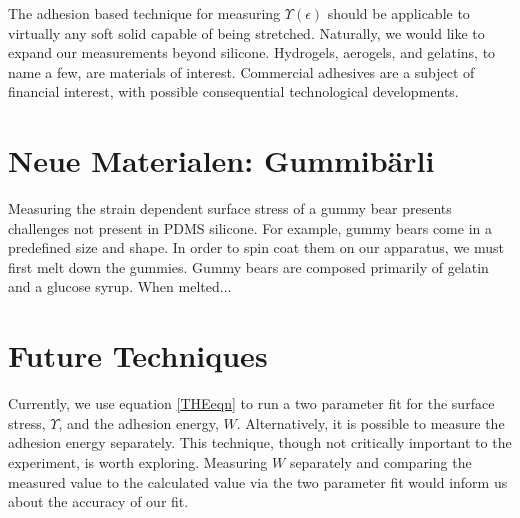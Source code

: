 The adhesion based technique for measuring $\Upsilon(\epsilon)$ should be applicable to virtually any soft solid capable of being stretched. Naturally, we would like to expand our measurements beyond silicone. Hydrogels, aerogels, and gelatins, to name a few, are materials of interest. Commercial adhesives are a subject of financial interest, with possible consequential technological developments.

\section{Neue Materialen: Gummibärli}
Measuring the strain dependent surface stress of a gummy bear presents challenges not present in PDMS silicone. For example, gummy bears come in a predefined size and shape. In order to spin coat them on our apparatus, we must first melt down the gummies. Gummy bears are composed primarily of gelatin and a glucose syrup. When melted...

\section{Future Techniques}
Currently, we use equation \ref{THEeqn} to run a two parameter fit for the surface stress, $ \Upsilon $, and the adhesion energy, $ W $. Alternatively, it is possible to measure the adhesion energy separately. This technique, though not critically important to the experiment, is worth exploring. Measuring $ W $ separately and comparing the measured value to the calculated value via the two parameter fit would inform us about the accuracy of our fit.  